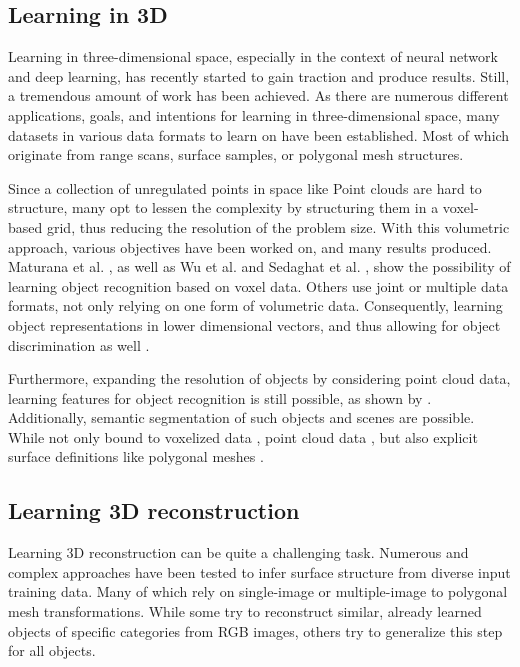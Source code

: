  \subsection{Learning in 3D}
 \label{learn3d}
 Learning in three-dimensional space, especially in the context of neural network and deep learning, has recently
  started to gain traction and produce results. Still, a tremendous amount of work has been achieved. 
 As there are numerous different applications, goals, and intentions for learning in three-dimensional space, many 
 datasets in various data formats to learn on have been established. Most of which originate from range scans, surface samples,
  or polygonal mesh structures. 
 
 Since a collection of unregulated points in space like Point clouds are hard to structure, many opt to lessen the 
 complexity by structuring them in a voxel-based grid, thus reducing the resolution of the problem size.
 With this volumetric approach, various objectives have been worked on, and many results produced. Maturana et al.
  \cite{Maturana2015VoxNet}, as well as Wu et al.\cite{inproceedings} and Sedaghat et al. \cite{SZB17a}, show the possibility of learning object recognition 
  based on voxel data. Others use joint or multiple data formats, not only relying on one form of volumetric data. Consequently, 
  learning object representations in lower dimensional vectors, and thus allowing for object discrimination as well 
  \cite{articlefusionnet,DBLP:journals/corr/QiSNDYG16,DBLP:journals/corr/BrockLRW16}.

  Furthermore, expanding the resolution of objects by considering point cloud data, learning features for object 
  recognition is still possible, as shown by
   \cite{DBLP:journals/corr/QiSMG16,qi2017pointnetplusplus,DBLP:journals/corr/KlokovL17,DBLP:journals/corr/abs-1801-07791,PointGrid}. Additionally,
    semantic segmentation of such objects and 
  scenes are possible. While not only bound to voxelized data \cite{DBLP:journals/corr/abs-1803-10409,DBLP:journals/corr/abs-1712-10215}, point cloud data \cite{DBLP:journals/corr/QiSMG16,qi2017pointnetplusplus,DBLP:journals/corr/DaiCSHFN17,Groh2017,inproceedingsparse,DBLP:journals/corr/abs-1710-07563}, but also explicit surface
   definitions like polygonal meshes \cite{feng2018meshnet,Kalogerakis:2010:labelMeshes,Sidi:2011:UCS:2024156.2024160,Kalogerakis:2017:ShapePFCN}.

 \subsection{Learning 3D reconstruction}
 \label{transform}
 Learning 3D reconstruction can be quite a challenging task.
  Numerous and complex approaches have been tested to infer surface 
  structure from diverse input training data. Many of which rely 
  on single-image or multiple-image to polygonal mesh transformations. 
 While some try to reconstruct similar, already learned objects of
  specific categories from RGB images, others try to generalize this 
  step for all objects. 
 
